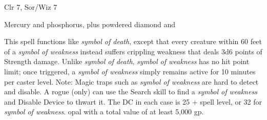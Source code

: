 
\begin{description*}
\item[Level:] Clr 7, Sor/Wiz 7
\item[Arcane Material Component:] Mercury and phosphorus, plus powdered diamond and
\end{description*}

This spell functions like \textit{symbol of death}, except that every creature
within 60 feet of a \textit{symbol of weakness} instead suffers crippling weakness
that deals 3d6 points of Strength damage.
Unlike \textit{symbol of death}, \textit{symbol of weakness} has no hit point limit;
once triggered, a \textit{symbol of weakness} simply remains active for 10 minutes
per caster level.
Note: Magic traps such as \textit{symbol of weakness} are hard to detect
and disable. A rogue (only) can use the Search skill to find a \textit{symbol of
weakness} and Disable Device to thwart it. The DC in each case is 25 + spell level,
or 32 for \textit{symbol of weakness}.
opal with a total value of at least 5,000 gp.